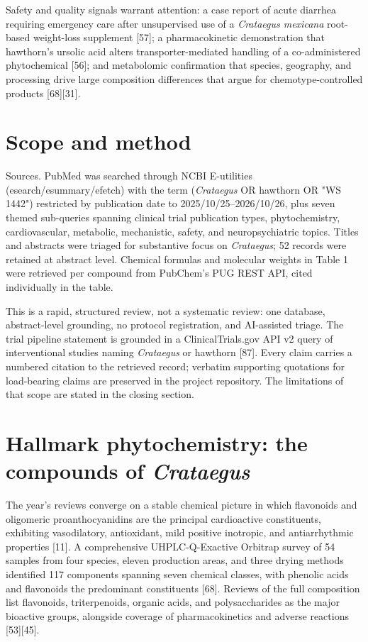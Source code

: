 \documentclass[11pt]{article}
\begin{document}
Safety and quality signals warrant attention: a case report of acute diarrhea requiring emergency care after unsupervised use of a \emph{Crataegus mexicana} root-based weight-loss supplement [57]; a pharmacokinetic demonstration that hawthorn's ursolic acid alters transporter-mediated handling of a co-administered phytochemical [56]; and metabolomic confirmation that species, geography, and processing drive large composition differences that argue for chemotype-controlled products [68][31].

\section*{Scope and method}
Sources. PubMed was searched through NCBI E-utilities (esearch/esummary/efetch) with the term (\emph{Crataegus} OR hawthorn OR "WS 1442") restricted by publication date to 2025/10/25--2026/10/26, plus seven themed sub-queries spanning clinical trial publication types, phytochemistry, cardiovascular, metabolic, mechanistic, safety, and neuropsychiatric topics. Titles and abstracts were triaged for substantive focus on \emph{Crataegus}; 52 records were retained at abstract level. Chemical formulas and molecular weights in Table 1 were retrieved per compound from PubChem's PUG REST API, cited individually in the table.

This is a rapid, structured review, not a systematic review: one database, abstract-level grounding, no protocol registration, and AI-assisted triage. The trial pipeline statement is grounded in a ClinicalTrials.gov API v2 query of interventional studies naming \emph{Crataegus} or hawthorn [87]. Every claim carries a numbered citation to the retrieved record; verbatim supporting quotations for load-bearing claims are preserved in the project repository. The limitations of that scope are stated in the closing section.

\section*{Hallmark phytochemistry: the compounds of \emph{Crataegus}}
The year's reviews converge on a stable chemical picture in which flavonoids and oligomeric proanthocyanidins are the principal cardioactive constituents, exhibiting vasodilatory, antioxidant, mild positive inotropic, and antiarrhythmic properties [11]. A comprehensive UHPLC-Q-Exactive Orbitrap survey of 54 samples from four species, eleven production areas, and three drying methods identified 117 components spanning seven chemical classes, with phenolic acids and flavonoids the predominant constituents [68]. Reviews of the full composition list flavonoids, triterpenoids, organic acids, and polysaccharides as the major bioactive groups, alongside coverage of pharmacokinetics and adverse reactions [53][45].
\end{document}
